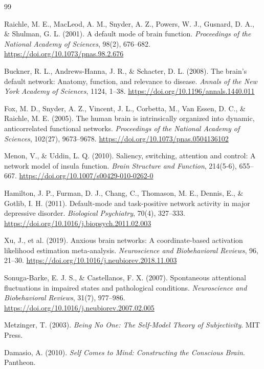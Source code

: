 \documentclass[11pt,a4paper]{article}
\begin{document}
\begin{thebibliography}{99}

Raichle, M. E., MacLeod, A. M., Snyder, A. Z., Powers, W. J., Gusnard, D. A., \& Shulman, G. L. (2001).
A default mode of brain function.
\textit{Proceedings of the National Academy of Sciences}, 98(2), 676--682.
\url{https://doi.org/10.1073/pnas.98.2.676}

Buckner, R. L., Andrews-Hanna, J. R., \& Schacter, D. L. (2008).
The brain's default network: Anatomy, function, and relevance to disease.
\textit{Annals of the New York Academy of Sciences}, 1124, 1--38.
\url{https://doi.org/10.1196/annals.1440.011}

Fox, M. D., Snyder, A. Z., Vincent, J. L., Corbetta, M., Van Essen, D. C., \& Raichle, M. E. (2005).
The human brain is intrinsically organized into dynamic, anticorrelated functional networks.
\textit{Proceedings of the National Academy of Sciences}, 102(27), 9673--9678.
\url{https://doi.org/10.1073/pnas.0504136102}

Menon, V., \& Uddin, L. Q. (2010).
Saliency, switching, attention and control: A network model of insula function.
\textit{Brain Structure and Function}, 214(5-6), 655--667.
\url{https://doi.org/10.1007/s00429-010-0262-0}

Hamilton, J. P., Furman, D. J., Chang, C., Thomason, M. E., Dennis, E., \& Gotlib, I. H. (2011).
Default-mode and task-positive network activity in major depressive disorder.
\textit{Biological Psychiatry}, 70(4), 327--333.
\url{https://doi.org/10.1016/j.biopsych.2011.02.003}

Xu, J., et al. (2019).
Anxious brain networks: A coordinate-based activation likelihood estimation meta-analysis.
\textit{Neuroscience and Biobehavioral Reviews}, 96, 21--30.
\url{https://doi.org/10.1016/j.neubiorev.2018.11.003}

Sonuga-Barke, E. J. S., \& Castellanos, F. X. (2007).
Spontaneous attentional fluctuations in impaired states and pathological conditions.
\textit{Neuroscience and Biobehavioral Reviews}, 31(7), 977--986.
\url{https://doi.org/10.1016/j.neubiorev.2007.02.005}

Metzinger, T. (2003).
\textit{Being No One: The Self-Model Theory of Subjectivity}.
MIT Press.

Damasio, A. (2010).
\textit{Self Comes to Mind: Constructing the Conscious Brain}.
Pantheon.


\end{thebibliography}
\end{document}
